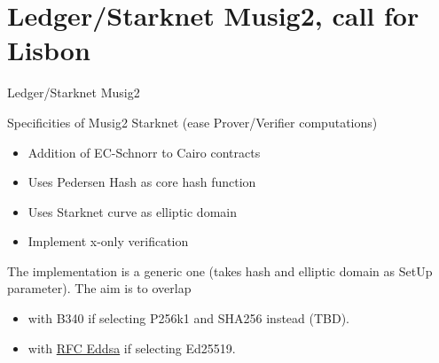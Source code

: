 \documentclass[aspectratio=43]{beamer}
\begin{document}
\section{Ledger/Starknet Musig2, call for Lisbon}



\begin{frame}{Ledger/Starknet Musig2}

Specificities of Musig2 Starknet (ease Prover/Verifier computations)
\begin{itemize}
\item Addition of EC-Schnorr to Cairo contracts
\item Uses Pedersen Hash as core hash function 
\item Uses Starknet curve as elliptic domain
\item Implement x-only verification
\end{itemize} 
The implementation is a generic one (takes hash and elliptic domain as SetUp parameter).
The aim is to overlap 
\begin{itemize}
\item with B340 if selecting P256k1 and SHA256 instead (TBD).
\item with \href{https://datatracker.ietf.org/doc/html/draft-irtf-cfrg-eddsa-05}{{\cyan RFC Eddsa}} if selecting Ed25519.        
\end{itemize}

     
\end{frame}
\end{document}
